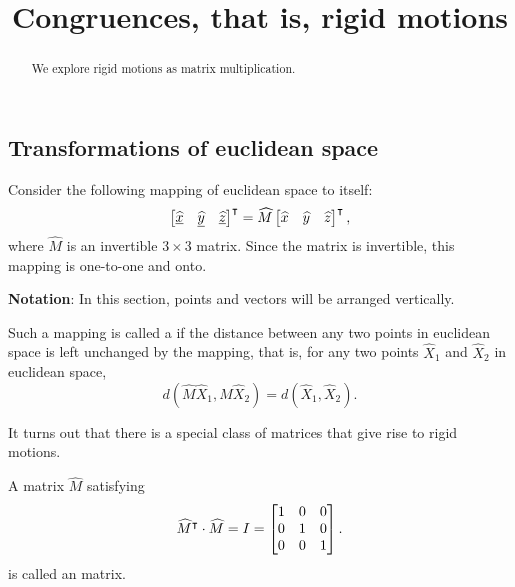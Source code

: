 \documentclass[newpage,hints,handout]{ximera}
\title{Congruences, that is, rigid motions}
\begin{document}
\begin{abstract}
We explore rigid motions as matrix multiplication.
\end{abstract}
\maketitle

\subsection*{Transformations of euclidean space}

Consider the following mapping of euclidean space to itself:%
\[
\begin{bmatrix}
\underline{\hat{x}} & \underline{\hat{y}} & \underline{\hat{z}}%
\end{bmatrix}^\transpose
=\hat M \begin{bmatrix} \hat{x} & \hat{y} & \hat{z}\end{bmatrix}^\transpose,
\]
where $\hat{M}$ is an invertible $3\times3$ matrix. Since the matrix
is invertible, this mapping is one-to-one and onto.

\textbf{Notation}: In this section, points and vectors will be arranged
vertically.

\begin{definition}
  Such a mapping is called a  if the distance between any two
  points in euclidean space is left unchanged by the mapping, that is, for
  any two points $\hat{X}_{1}$ and $\hat{X}_{2}$ in euclidean space,%
  \[
  d(\hat{M}\hat{X}_{1},\hat M\hat{X}_{2})=d(\hat{X}_{1},\hat{X}_{2}).
  \]
\end{definition}

It turns out that there is a special class of matrices that give rise
to rigid motions.

\begin{definition}
  A matrix $\hat{M}$ satisfying
  \[
  \widehat{M}^\intercal\cdot\widehat{M}=I=\begin{bmatrix}
  1 & 0 & 0\\
  0 & 1 & 0\\
  0 & 0 & 1
  \end{bmatrix}.
  \]
  is called an  matrix.
\end{definition}
\end{document}
